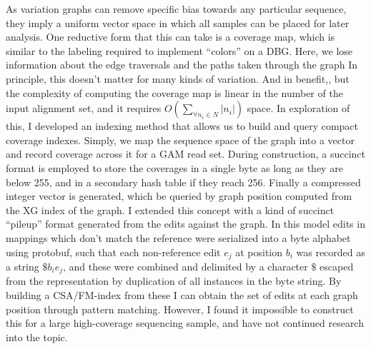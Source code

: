 As variation graphs can remove specific bias towards any particular sequence, they imply a uniform vector space in which all samples can be placed for later analysis.
One reductive form that this can take is a coverage map, which is similar to the labeling required to implement ``colors'' on a DBG.
Here, we lose information about the edge traversals and the paths taken through the graph
In principle, this doesn't matter for many kinds of variation.
And in benefit,, but the complexity of computing the coverage map is linear in the number of the input alignment set, and it requires $O(\sum_{\forall{n_i\in N}}|n_i|)$ space.
In exploration of this, I developed an indexing method that allows us to build and query compact coverage indexes.
Simply, we map the sequence space of the graph into a vector and record coverage across it for a GAM read set.
During construction, a succinct format is employed to store the coverages in a single byte as long as they are below 255, and in a secondary hash table if they reach 256.
Finally a compressed integer vector is generated, which be queried by graph position computed from the XG index of the graph.
I extended this concept with a kind of succinct ``pileup'' format \cite{li2009sequence} generated from the edits against the graph.
In this model edits in mappings which don't match the reference were serialized into a byte alphabet using protobuf, such that each non-reference edit $e_j$ at position $b_i$ was recorded as a string $\$b_i e_j$, and these were combined and delimited by a character $\$$ escaped from the representation by duplication of all instances in the byte string.
By building a CSA/FM-index from these I can obtain the set of edits at each graph position through pattern matching.
However, I found it impossible to construct this for a large high-coverage sequencing sample, and have not continued research into the topic.

